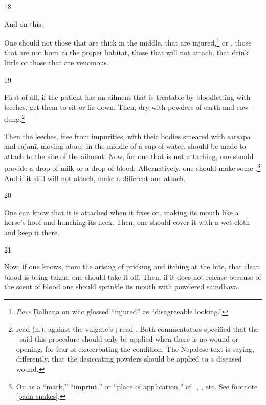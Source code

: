 \begin{translation}
\item[18]

And on this:

\begin{sloka}
    One should not  those that are thick in the middle, that are
injured,\footnote{\emph{Pace} Ḍalhaṇa on  who glossed
     “injured” as  “disagreeable
    looking.”} or , those that are not born in the proper habitat,
    those that will not attach, that drink little or those that are venomous.
\end{sloka}

\item[19] 

First of all, if the patient  has an ailment that is treatable by bloodletting
with leeches, get them to sit or lie down.  Then, dry  with powders of earth and 
    cow-dung.\footnote{ read
     (n.), against the vulgate's ; 
    read . Both commentators specified that the \SS\ said this 
    procedure
    should only be applied when there is no wound or opening, for fear of
    exacerbating the condition.  The Nepalese text is saying, differently, that the
    desiccating powders should be applied to a diseased wound. }  
    
    
Then the leeches, free from impurities, with their bodies smeared with
\gls{sarṣapa} and \gls{rajanī}, moving about in the middle of a cup of water,
should be made to attach to the site of the ailment.  Now, for one that is not
attaching, one should provide a drop of milk or a drop of blood. Alternatively,
one should make some .\footnote{\label{pada-leeches}On  as a “mark,” “imprint,” 
    or
    “place of application,” cf.\ , , etc.  See
    footnote \ref{pada-snakes}.} And if it still will not attach, make a different 
    one
    attach.

\item [20]
 
One can know that it is attached when it fixes on, making its mouth like a 
horse's hoof and hunching its neck. Then, one should cover it with a wet
cloth and keep it there.
 
 \item[21]
 
Now, if one knows, from the arising of pricking and itching at the
bite, that clean blood is being taken, one should take it off.  Then,
if it does not release because of the scent of blood one should sprinkle its
mouth with powdered \gls{saindhava}.
    

\end{translation}

